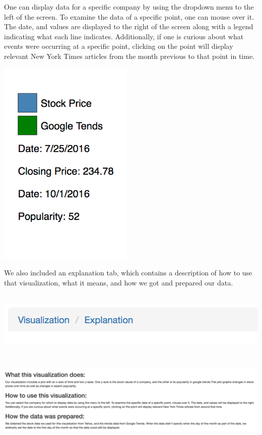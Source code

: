 \documentclass[12pt]{article}
\begin{document}
\begin{enumerate}
One can display data for a specific company by using the dropdown menu
to the left of the screen. To examine the data of a specific point,
one can mouse over it. The date, and values are displayed to the right
of the screen along with a legend indicating what each line
indicates. Additionally, if one is curious about what events were
occurring at a specific point, clicking on the point will display
relevant New York Times articles from the month previous to that point
in time. 

\includegraphics[height=10cm]{legend.png} 

We also included an explanation tab, which contains a description of
how to use that visualization, what it means, and how we got and
prepared our data. 

\includegraphics[height=3cm]{tabs.png} 

\includegraphics[height=4cm]{explain.png}


\end{enumerate}
\end{document}
